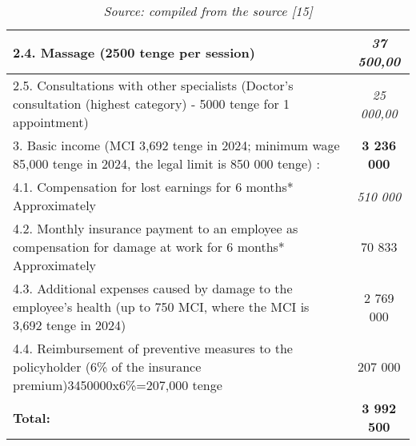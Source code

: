 \begin{table}[H]
\begin{tabular}{|p{}|c|}
2.4. Massage (2500 tenge per session)                                                                                    & \textit{37 500,00}  \\ \hline
2.5. Consultations with other specialists (Doctor's consultation (highest category) - 5000 tenge for 1 appointment)                          & \textit{25 000,00}  \\ \hline
3. Basic income (MCI 3,692 tenge in 2024; minimum wage 85,000 tenge in 2024, the legal limit is 850 000 tenge) :         & \textbf{3 236 000}  \\ \hline
4.1. Compensation for lost earnings for 6 months* Approximately                                                          & \textit{510 000}    \\ \hline
4.2. Monthly insurance payment to an employee as compensation for damage at work for 6 months* Approximately             & 70 833              \\ \hline
4.3. Additional expenses caused by damage to the employee's health (up to 750 MCI, where the MCI is 3,692 tenge in 2024) & 2 769 000           \\ \hline
4.4. Reimbursement of preventive measures to the policyholder (6\% of the insurance premium)3450000x6\%=207,000 tenge    & 207 000             \\ \hline
\textbf{Total:}                                                                                                          & \textbf{3 992 500}  \\ \hline
\end{tabular}
\caption*{{\normalfont \emph{Source: compiled from the source [15]}}}
\end{table}

